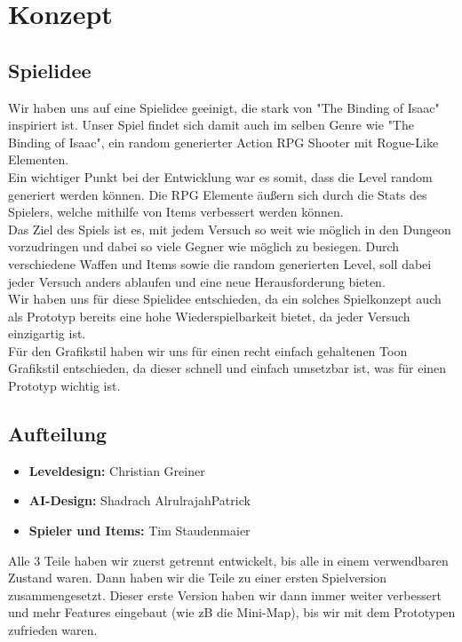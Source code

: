\section{Konzept}

\subsection{Spielidee}
Wir haben uns auf eine Spielidee geeinigt, die stark von "The Binding of Isaac" inspiriert ist. Unser Spiel findet sich damit auch im selben Genre wie "The Binding of Isaac", ein random generierter Action RPG Shooter mit Rogue-Like Elementen.\\
Ein wichtiger Punkt bei der Entwicklung war es somit, dass die Level random generiert werden können. Die RPG Elemente äußern sich durch die Stats des Spielers, welche mithilfe von Items verbessert werden können. \\
Das Ziel des Spiels ist es, mit jedem Versuch so weit wie möglich in den Dungeon vorzudringen und dabei so viele Gegner wie möglich zu besiegen. Durch verschiedene Waffen und Items sowie die random generierten Level, soll dabei jeder Versuch anders ablaufen und eine neue Herausforderung bieten.\\
Wir haben uns für diese Spielidee entschieden, da ein solches Spielkonzept auch als Prototyp bereits eine hohe Wiederspielbarkeit bietet, da jeder Versuch einzigartig ist.\\
Für den Grafikstil haben wir uns für einen recht einfach gehaltenen Toon Grafikstil entschieden, da dieser schnell und einfach umsetzbar ist, was für einen Prototyp wichtig ist.

\subsection{Aufteilung}
\begin{itemize}
\item \textbf{Leveldesign:} Christian Greiner
\item \textbf{AI-Design:} Shadrach AlrulrajahPatrick
\item \textbf{Spieler und Items:} Tim Staudenmaier
\end{itemize}
Alle 3 Teile haben wir zuerst getrennt entwickelt, bis alle in einem verwendbaren Zustand waren. Dann haben wir die Teile zu einer ersten Spielversion zusammengesetzt. Dieser erste Version haben wir dann immer weiter verbessert und mehr Features eingebaut (wie zB die Mini-Map), bis wir mit dem Prototypen zufrieden waren.

